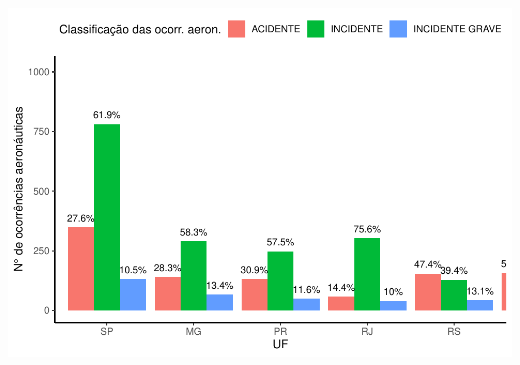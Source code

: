\documentclass[
]{article}
\begin{document}
\begin{center}\includegraphics[width=1\linewidth]{../4.Relatorio/pdf/index_files/figure-latex/unnamed-chunk-33-1} \end{center}
\end{document}
